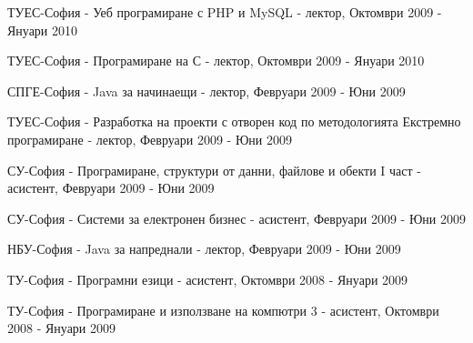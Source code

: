 \documentclass[bulgarian,a4paper]{europasscv}
\begin{document}
\begin{europasscv}
{\begin{ecvitemize}
    \item ТУЕС-София - Уеб програмиране с PHP и MySQL - лектор, Октомври 2009 - Януари 2010
    \item ТУЕС-София - Програмиране на С - лектор, Октомври 2009 - Януари 2010
    \item СПГЕ-София - Java за начинаещи - лектор, Февруари 2009 - Юни 2009
    \item ТУЕС-София - Разработка на проекти с отворен код по методологията Екстремно програмиране - лектор, Февруари 2009 - Юни 2009
    \item СУ-София - Програмиране, структури от данни, файлове и обекти I част - асистент, Февруари 2009 - Юни 2009
    \item СУ-София - Системи за електронен бизнес - асистент, Февруари 2009 - Юни 2009
    \item НБУ-София - Java за напреднали - лектор, Февруари 2009 - Юни 2009
    \item ТУ-София - Програмни езици - асистент, Октомври 2008 - Януари 2009
    \item ТУ-София - Програмиране и използване на компютри 3 - асистент, Октомври 2008 - Януари 2009
  \end{ecvitemize}}
  

\end{europasscv}
\end{document}
